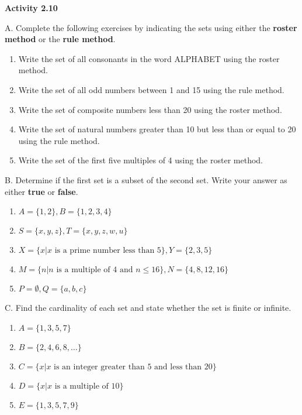 \vspace{0.3ex}
\noindent\textbf{Activity 2.10}

\vspace{0.2ex}

\noindent A. Complete the following exercises by indicating the sets using either the \textbf{roster method} or the \textbf{rule method}.

\begin{enumerate}[label=\color{blue}\arabic*. , noitemsep]
    \item Write the set of all consonants in the word ALPHABET using the roster method.
    \item Write the set of all odd numbers between 1 and 15 using the rule method.
    \item Write the set of composite numbers less than 20 using the roster method.
    \item Write the set of natural numbers greater than 10 but less than or equal to 20 using the rule method.
    \item Write the set of the first five multiples of 4 using the roster method.
\end{enumerate}

\noindent B. Determine if the first set is a subset of the second set. Write your answer as either \textbf{true} or \textbf{false}. 

\begin{enumerate}[label=\color{blue}\arabic*. , noitemsep]
    \item \( A = \{1, 2\}, B = \{1, 2, 3, 4\} \)
    \item \( S = \{x, y, z\}, T = \{x, y, z, w, u\} \)
    \item \( X = \{x | x \text{ is a prime number less than 5}\}, Y = \{2, 3, 5\} \)
    \item \( M = \{n | n \text{ is a multiple of 4 and } n \leq 16\}, N = \{4, 8, 12, 16\} \)
    \item \( P = \emptyset, Q = \{a, b, c\} \)
\end{enumerate}

\noindent C. Find the cardinality of each set and state whether the set is finite or infinite.

\begin{enumerate}[label=\color{blue}\arabic*. , noitemsep]
    \item \( A = \{1, 3, 5, 7\} \)
    \item \( B = \{2, 4, 6, 8, \ldots\} \)
    \item \( C = \{x | x \text{ is an integer greater than 5 and less than 20}\} \)
    \item \( D = \{x | x \text{ is a multiple of 10}\} \)
    \item \( E = \{1, 3, 5, 7, 9\} \)
\end{enumerate}
